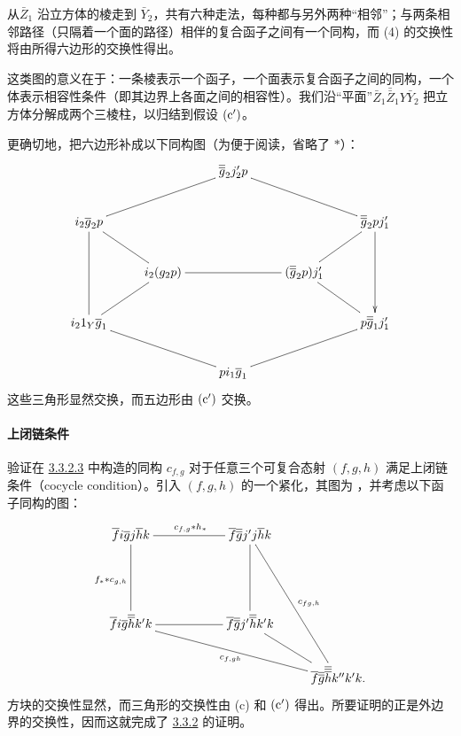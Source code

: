 从\pageoriginale $\bar{Z}_1$ 沿立方体的棱走到 $\bar{Y}_2$，共有六种走法，每种都与另外两种“相邻”；与两条相邻路径（\ie 只隔着一个面的路径）相伴的复合函子之间有一个同构，而 (4) 的交换性将由所得六边形的交换性得出。

这类图的意义在于：一条棱表示一个函子，一个面表示复合函子之间的同构，一个体表示相容性条件（即其边界上各面之间的相容性）。我们沿“平面”$\bar{Z}_1 \bar{\bar{Z}}_1 Y \bar{Y}_2$ 把立方体分解成两个三棱柱，以归结到假设 ${\rm(c')}$。

更确切地，把六边形补成以下同构图（为便于阅读，省略了 ${\ast}$）：
\[
\xymatrix{
                   & & \bar{\bar{g}}_2 j'_2p      & &   \\
i_2\bar{g}_2 p  \ar@{-}[rru] \ar@{-}[rd]\ar@{-}[dd] &   &   &&   \bar{\bar{g}}_2 p j'_1 \ar@{-}[ld]\ar[dd]\ar@{-}[llu]\\
 & i_2(g_2p) \ar@{-}[rr]&      & (\bar{\bar{g}}_2p)j'_1 & \\
i_21_{Y}\bar{g}_1 \ar@{-}[ru] \ar@{-}[rrd]&      &&   &
  p\bar{\bar{g}}_1 j'_1 \ar@{-}[lu] \ar@{-}[lld]\\
&  &  pi_1 \bar{g}_1  & &
}
\]
这些\pageoriginale 三角形显然交换，而五边形由 ${\rm(c')}$ 交换。

\paragraph{上闭链条件}

验证在 \hyperref[XVII.par3.3.2.3]{3.3.2.3} 中构造的同构 $c_{f,g}$ 对于任意三个可复合态射 $(f,g,h)$ 满足上闭链条件（cocycle condition）。引入 $(f,g,h)$ 的一个紧化，其图为 ，并考虑以下函子同构的图：
\[
\sisi{\xymatrix{
\bar{f} i \bar{g} j \bar{h} k \ar@{-}[rr] \ar@{-}[dd]&
&\bar{f}\bar{\bar{g}} j' j\bar{h} k \ar@{-}[dd]\\
 & \bar{f}\bar{\bar{g}}j' \bar{\bar{h}}
k' k \ar@{-}[rd]&\\
\bar{f} i \bar{g}\bar{\bar{h}}k' k \ar@{-}[ru] \ar@{-}[rr]&    &
\bar{f}\bar{\bar{g}}\bar{\bar{h}}k'' k' k.
}}{\xymatrix{
\bar{f} i \bar{g} j \bar{h} k \ar@{-}[rr]^{c_{f,g}*h_*} \ar@{-}[dd]_{f_**c_{g,h}}&&
\bar{f}\bar{\bar{g}} j' j\bar{h} k \ar@{-}[dd]\ar@{-}[rddd]^{c_{fg,h}}\\
&\\
\bar{f} i \bar{g}\bar{\bar{h}}k' k \ar@{-}[rrrd]_{c_{f,gh}} \ar@{-}[rr] && \bar{f}\bar{\bar{g}}j' \bar{\bar{h}}
k' k \ar@{-}[rd]\\
& &   & \bar{f}\bar{\bar{g}}\bar{\bar{\bar{h}}}k'' k' k.
}}
\]
方块的交换性显然，而三角形的交换性由 (c) 和 ${\rm(c')}$ 得出。所要证明的正是外边界的交换性，因而这就完成了 \hyperref[XVII.prop3.3.2]{3.3.2} 的证明。

